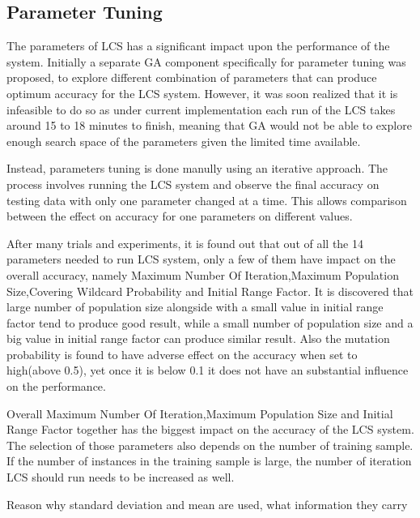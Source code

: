 \documentclass[11pt]{article}
\begin{document}
\subsection{Parameter Tuning}

%
%
%

The parameters of LCS has a significant impact upon the performance of the system. Initially a separate GA component specifically for parameter tuning was proposed, to explore different combination of parameters that can produce optimum accuracy for the LCS system. However, it was soon realized that it is infeasible to do so as under current implementation each run of the LCS takes around 15 to 18 minutes to finish, meaning that GA would not be able to explore enough search space of the parameters given the limited time available.

Instead, parameters tuning is done manully using an iterative approach. The process involves running the LCS system and observe the final accuracy on testing data with only one parameter changed at a time. This allows comparison between the effect on accuracy for one parameters on different values.

After many trials and experiments, it is found out that out of all the 14 parameters needed to run LCS system, only a few of them have impact on the overall accuracy, namely Maximum Number Of Iteration,Maximum Population Size,Covering Wildcard Probability and Initial Range Factor. It is discovered that large number of population size alongside with a small value in initial range factor tend to produce good result, while a small number of population size and a big value in initial range factor can produce similar result. Also the mutation probability is found to have adverse effect on the accuracy when set to high(above 0.5), yet once it is below 0.1 it does not have an substantial influence on the performance.

Overall Maximum Number Of Iteration,Maximum Population Size and Initial Range Factor together has the biggest impact on the accuracy of the LCS system. The selection of those parameters also depends on the number of training sample. If the number of instances in the training sample is large, the number of iteration LCS should run needs to be increased as well.


Reason why standard deviation and mean are used, what information they carry
\end{document}
